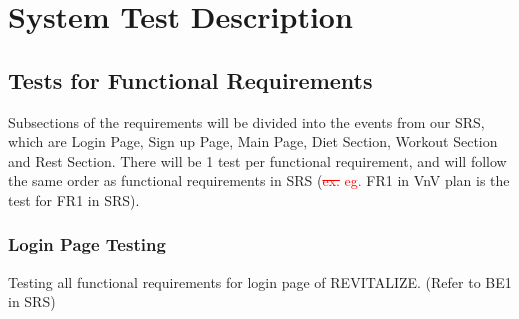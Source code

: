 \documentclass[12pt, titlepage]{article}
\begin{document}
\section{System Test Description}

\subsection{Tests for Functional Requirements}

Subsections of the requirements will be divided into the events from our SRS, which are Login Page, Sign up Page, Main Page, Diet Section, Workout Section and Rest Section. There will be 1 test per functional requirement, and will follow the same order as functional requirements in SRS (\textcolor{red}{\sout{ex.}} \textcolor{red}{eg.} FR1 in VnV plan is the test for FR1 in SRS).

\subsubsection{Login Page Testing}

Testing all functional requirements for login page of REVITALIZE. (Refer to BE1 in SRS)
\end{document}
